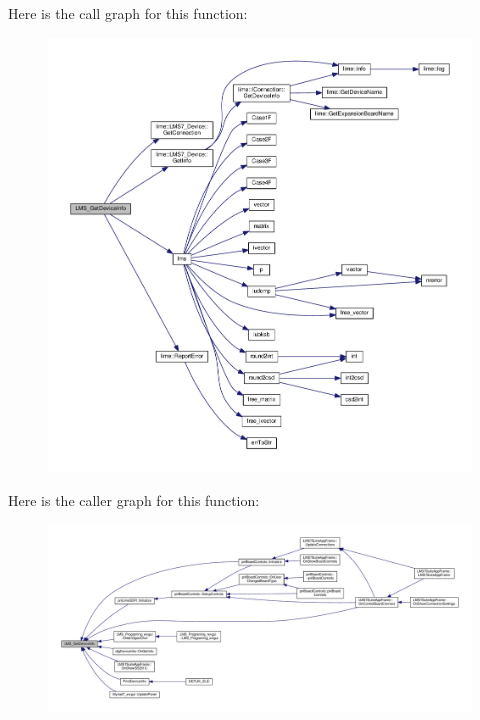Here is the call graph for this function\+:
\nopagebreak
\begin{figure}[H]
\begin{center}
\leavevmode
\includegraphics[width=350pt]{df/de1/lms7__api_8cpp_a9b072759ccce533468db9bb3c97a417d_cgraph}
\end{center}
\end{figure}




Here is the caller graph for this function\+:
\nopagebreak
\begin{figure}[H]
\begin{center}
\leavevmode
\includegraphics[width=350pt]{df/de1/lms7__api_8cpp_a9b072759ccce533468db9bb3c97a417d_icgraph}
\end{center}
\end{figure}


